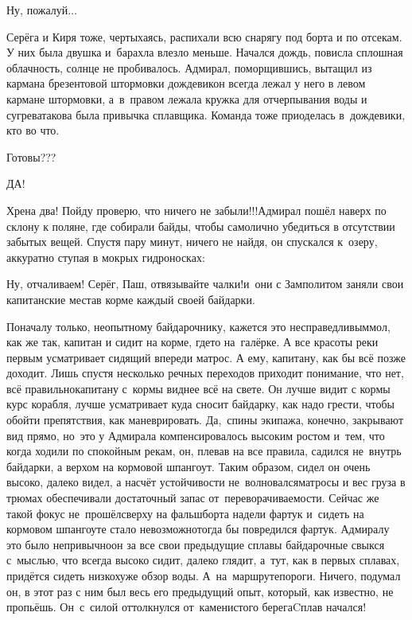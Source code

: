 \diagdash Ну, пожалуй$\ldots$

Серёга и Киря тоже, чертыхаясь, распихали всю снарягу под борта и по отсекам. У них была двушка и~барахла влезло меньше. Начался дождь, повисла сплошная облачность, солнце не пробивалось. Адмирал, поморщившись, вытащил из кармана брезентовой штормовки дождевик\mdash он всегда лежал у него в левом кармане штормовки, а~в~правом лежала кружка для отчерпывания воды и сугрева\mdash такова была привычка сплавщика. Команда тоже приоделась в~дождевики, кто во что.

\diagdash Готовы???

\diagdash ДА!

\diagdash Хрена два! Пойду проверю, что ничего не забыли!!!\mdash Адмирал пошёл наверх по склону к поляне, где собирали байды, чтобы самолично убедиться в отсутствии забытых вещей. Спустя пару минут, ничего не найдя, он спускался к~озеру, аккуратно ступая в мокрых гидроносках:

\diagdash Ну, отчаливаем! Серёг, Паш, отвязывайте чалки!\mdash и~они с Замполитом заняли свои капитанские места\mdash в корме каждый своей байдарки. 

Поначалу только, неопытному байдарочнику, кажется это несправедливым\mdash мол, как же так, капитан и сидит на корме, где\sdash то на~галёрке. А все красоты реки первым усматривает сидящий впереди матрос. А ему, капитану, как бы всё позже доходит. Лишь спустя несколько речных переходов приходит понимание, что нет, всё правильно\mdash капитану с~кормы виднее всё на свете. Он лучше видит с кормы курс корабля, лучше усматривает куда сносит байдарку, как надо грести, чтобы обойти препятствия, как маневрировать. Да,~спины экипажа, конечно, закрывают вид прямо, но~это у Адмирала компенсировалось высоким ростом и~тем, что когда ходили по спокойным рекам, он, плевав на все правила, садился не~внутрь байдарки, а верхом на кормовой шпангоут. Таким образом, сидел он очень высоко, далеко видел, а насчёт устойчивости не~волновался\mdash матросы и вес груза в трюмах обеспечивали достаточный запас от~переворачиваемости. Сейчас же такой фокус не~прошёл\mdash сверху на фальшборта надели фартук и~сидеть на кормовом шпангоуте стало невозможно\mdash тогда бы повредился фартук. Адмиралу это было непривычно\mdash он за все свои предыдущие сплавы байдарочные свыкся с~мыслью, что всегда высоко сидит, далеко глядит, а~тут, как в первых сплавах, придётся сидеть низко\mdash хуже обзор воды. А~на~маршруте\mdash пороги. Ничего, подумал он, в этот раз с ним был весь его предыдущий опыт, который, как известно, не пропьёшь. Он~с~силой оттолкнулся от~каменистого берега\mdash Cплав начался!

